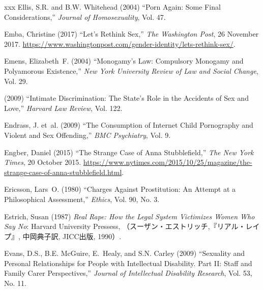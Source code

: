\documentclass[]{jlreq} \usepackage{mystyle}
\begin{document}
\begin{thebibliography}{xxx}
Ellis, S.R. and B.W. Whitehead (2004) ``Porn Again: Some Final
  Considerations,'' \textit{ Journal of Homosexuality}, Vol. 47.

Emba, Christine (2017) ``Let's Rethink Sex,'' \emph{The Washington Post}, 26
  November 2017.
  \url{https://www.washingtonpost.com/gender-identity/lets-rethink-sex/}.

Emens, Elizabeth~F. (2004) ``Monogamy's Law: Compulsory Monogamy and
  Polyamorous Existence,'' \textit{ New York University Review of Law and
  Social Change}, Vol. 29.

 \bysame{}  (2009) ``Intimate Discrimination: The State's Role in the Accidents
  of Sex and Love,'' \textit{ Harvard Law Review}, Vol. 122.

Endrass, J. et~al. (2009) ``The Consumption of Internet Child Pornography and
  Violent and Sex Offending,'' \textit{ BMC Psychiatry}, Vol. 9.

Engber, Daniel (2015) ``The Strange Case of Anna Stubblefield,'' \emph{The New
  York Times}, 20 October 2015.
  \url{https://www.nytimes.com/2015/10/25/magazine/the-strange-case-of-anna-stubblefield.html}.

Ericsson, Lars~O. (1980) ``Charges Against Prostitution: An Attempt at a
  Philosophical Assessment,'' \textit{ Ethics}, Vol. 90, No. 3.

Estrich, Susan (1987)  \textit{ Real Rape: How the Legal System Victimizes
  Women Who Say No}: Harvard University Pressess,
  （スーザン・エストリッチ,『リアル・レイプ』,
  中岡典子訳, JICC出版, 1990）.

Evans, D.S., B.E. McGuire, E.~Healy, and S.N. Carley (2009) ``Sexuality and
  Personal Relationships for People with Intellectual Disability. Part II:
  Staff and Family Carer Perspectives,'' \textit{ Journal of Intellectual
  Disability Research}, Vol. 53, No. 11.


\end{thebibliography}
\end{document}
